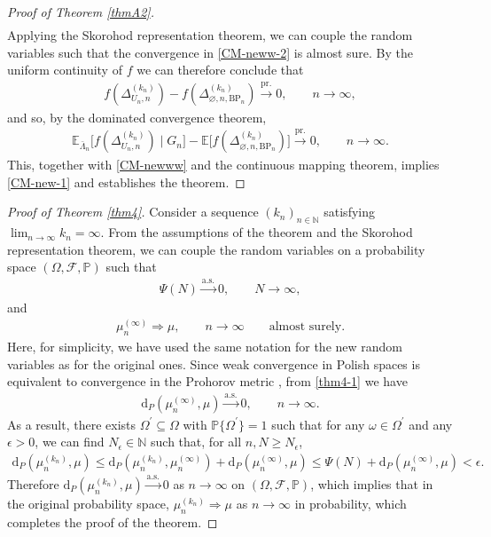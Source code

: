 \documentclass[11pt]{article}
\numberwithin{equation}{section}
\theoremstyle{plain}
\newcommand{\N}{\mathbb N}
\newcommand{\prob}{\overset{\mathrm{pr.}}{\longrightarrow}}
\newcommand{\as}{\overset{\mathrm{a.s.}}{\longrightarrow}}
\newcommand{\weak}{\Longrightarrow}
\newcommand{\E}{\mathbb E}
\renewcommand{\P}{\mathbb P}
\begin{document}
\begin{proof}[Proof of Theorem \ref{thmA2}]
\begin{align}
\end{align}
Applying the Skorohod representation theorem, we can couple the random variables such that the convergence in \eqref{CM-neww-2} is almost sure. By the uniform continuity of $f$ we can therefore conclude that 
\begin{align*}
f(\Delta_{U_n,n}^{(k_n)}) - f(\Delta_{\varnothing ,n,\mathrm{BP}_{n}}^{(k_n)}) \prob 0, \qquad n\to\infty,
\end{align*}
and so, by the dominated convergence theorem, 
\begin{align*}
\E_{\bar{\Lambda}_{n}}\big[f(\Delta_{U_n,n}^{(k_n)}) \mid G_{n}\big] 
- \E\big[f(\Delta_{\varnothing ,n,\mathrm{BP}_{n}}^{(k_n)})\big] \prob 0,\qquad n\to\infty.
\end{align*}
This, together with \eqref{CM-newww} and the continuous mapping theorem, implies \eqref{CM-new-1} and establishes the theorem.
\end{proof}


\begin{proof}[Proof of Theorem \ref{thm4}]
Consider a sequence $(k_n)_{n\in\N}$ satisfying $\lim_{n\to\infty} k_n = \infty$. From the assumptions of the theorem and the Skorohod representation theorem, we can couple the random variables on a probability space $(\Omega,\mathcal{F},\mathbb{P})$ such that
\begin{align*}
\Psi(N)\as 0, \qquad N\to\infty,
\end{align*}
and
\begin{align}
\label{thm4-1}
\mu_{n}^{(\infty)} \weak \mu, \qquad n\to\infty \qquad \text{almost surely.}
\end{align}
Here, for simplicity, we have used the same notation for the new random variables as for the original ones. Since weak convergence in Polish spaces is equivalent to convergence in the Prohorov metric \cite[Theorem 6.8]{Billingsley}, from \eqref{thm4-1} we have
\begin{align*}
\mathrm{d}_{P}(\mu_{n}^{(\infty)},\mu )\as 0,\qquad n\to\infty. 
\end{align*}
As a result, there exists $\Omega^{\prime}\subseteq \Omega$ with $\P\{\Omega^{\prime}\}=1$ such that for any $\omega\in\Omega^{\prime}$ and any $\epsilon>0$, we can find $N_{\epsilon}\in\N$ such that, for all $n,N\geq N_{\epsilon}$,
\begin{align*}
\mathrm{d}_{P}(\mu_{n}^{(k_n)},\mu )\leq \mathrm{d}_{P}(\mu_{n}^{(k_n)},\mu_{n}^{(\infty)} )
+ \mathrm{d}_{P}(\mu_{n}^{(\infty)},\mu )\leq \Psi(N)+\mathrm{d}_{P}(\mu_{n}^{(\infty)},\mu ) < \epsilon.
\end{align*}
Therefore $\mathrm{d}_{P}(\mu_{n}^{(k_n)},\mu)\as 0$ as $n\to\infty$ on $(\Omega , \mathcal{F},\mathbb{P})$, which implies that in the original probability space, $\mu_{n}^{(k_n)} \weak \mu$ as $n\to\infty$ in probability, which completes the proof of the theorem.
\end{proof}
\end{document}

